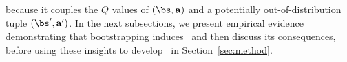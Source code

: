 because it couples the $Q$ values of $(\bs, \mathbf{a})$ and a potentially out-of-distribution tuple $(\bs', \mathbf{a}')$.
In the next subsections, we present empirical evidence demonstrating that bootstrapping induces \aliasingproblemname\ and then discuss its consequences, before using these insights to develop \methodname\ in Section~\ref{sec:method}.  



